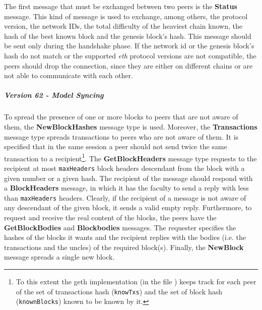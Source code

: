 The first message that must be exchanged between two peers is the
\textbf{Status} message. This kind of message is used to exchange, among others,
the protocol version, the network IDs, the total difficulty of the heaviest
chain known, the hash of the best known block and the genesis block's hash. This
message should be sent only during the handshake phase. If the network id or the
genesis block's hash do not match or the supported \emph{eth} protocol versions
are not compatible, the peers should drop the connection, since they are either
on different chains or are not able to communicate with each other.

\subparagraph{Version 62 - Model Syncing}
To spread the presence of one or more blocks to peers that are not aware of
them, the \textbf{NewBlockHashes} message type is used. Moreover, the
\textbf{Transactions} message type spreads transactions to peers who are not
aware of them. It is specified that in the same session a peer should not send
twice the same transaction to a recipient\footnote{To this extent the geth
implementation (in the file ) keeps track for each peer of the
set of transactions hash (\texttt{knowTxs}) and the set of block hash
(\texttt{knownBlocks}) known to be known by it.}. The \textbf{GetBlockHeaders}
message type requests to the recipient at most \texttt{maxHeaders} block headers
descendant from the block with a given number or a given hash. The recipient of
the message should respond with a \textbf{BlockHeaders} message, in which it has
the faculty to send a reply with less than \texttt{maxHeaders} headers. Clearly,
if the recipient of a message is not aware of any descendant of the given block,
it sends a valid empty reply. Furthermore, to request and receive the real
content of the blocks, the peers have the \textbf{GetBlockBodies} and
\textbf{Blockbodies} messages. The requester specifies the hashes of the blocks
it wants and the recipient replies with the bodies (i.e. the transactions and
the uncles) of the required block(s). Finally, the \textbf{NewBlock} message
spreads a single new block.

